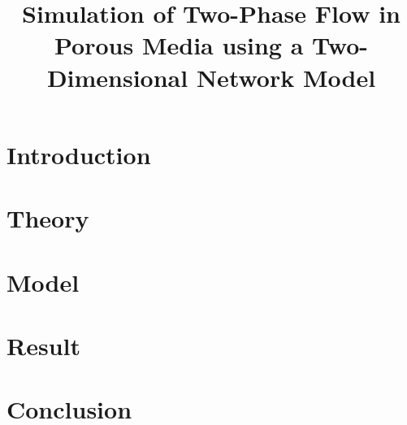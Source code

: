 \documentclass[
	12pt
] {article}
\title{Simulation of Two-Phase Flow in Porous Media using a Two-Dimensional Network Model}
\begin{document}
	\maketitle
	
	
		\newpage
		
	\tableofcontents
		\newpage
		
	\begin{abstract}
		
	\end{abstract}
		
	\section{Introduction}
		
		
	\section{Theory}
		
		
	\section{Model}
		

	\section{Result}
		

	\section{Conclusion}
		
		
	
	
		
\end{document}
